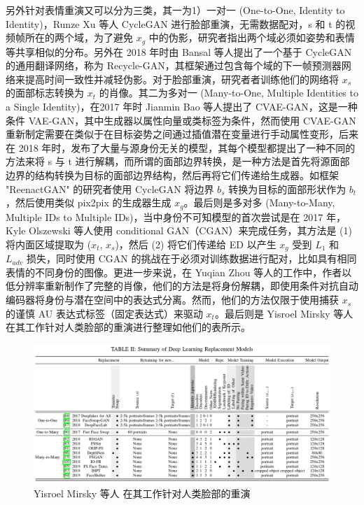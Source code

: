另外针对表情重演又可以分为三类，其一为1）一对一 (One-to-One, Identity to Identity)，Runze Xu 等人 CycleGAN 进行脸部重演，无需数据配对，s 和 t 的视频帧所在的两个域，为了避免 $x_g$ 中的伪影，研究者指出两个域必须如姿势和表情等共享相似的分布。另外在 2018 年时由 Bansal 等人提出了一个基于 CycleGAN 的通用翻译网络，称为 Recycle-GAN，其框架通过包含每个域的下一帧预测器网络来提高时间一致性并减轻伪影。对于脸部重演，研究者者训练他们的网络将 $x_s$ 的面部标志转换为 $x_t$ 的肖像。其二为多对一 (Many-to-One, Multiple Identities to a Single Identity)，在2017 年时 Jianmin Bao 等人提出了 CVAE-GAN，这是一种条件 VAE-GAN，其中生成器以属性向量或类标签为条件，然而使用 CVAE-GAN 重新制定需要在类似于在目标姿势之间通过插值潜在变量进行手动属性变形，后来在 2018 年时，发布了大量与源身份无关的模型，其每个模型都提出了一种不同的方法来将 s 与 t 进行解耦，而所谓的面部边界转换，是一种方法是首先将源面部边界的结构转换为目标的面部边界结构，然后再将它们传递给生成器。如框架 "ReenactGAN" 的研究者使用 CycleGAN 将边界 $b_s$ 转换为目标的面部形状作为 $b_t$ ，然后使用类似 pix2pix 的生成器生成 $x_g$。最后则是多对多 (Many-to-Many, Multiple IDs to Multiple IDs)，当中身份不可知模型的首次尝试是在 2017 年，Kyle Olszewski 等人使用 conditional GAN（CGAN）来完成任务，其方法是 (1) 将内面区域提取为 ($x_t$, $x_s$)，然后 (2) 将它们传递给 ED 以产生 $x_g$ 受到 $L_1$ 和 $L_{adv}$ 损失，同时使用 CGAN 的挑战在于必须对训练数据进行配对，比如具有相同表情的不同身份的图像。更进一步来说，在 Yuqian Zhou 等人的工作中，作者以低分辨率重新制作了完整的肖像，他们的方法是将身份解耦，即使用条件对抗自动编码器将身份与潜在空间中的表达式分离。然而，他们的方法仅限于使用捕获 $x_s$ 的谨慎 AU 表达式标签（固定表达式）来驱动 $x_t$。最后则是 Yisroel Mirsky 等人 \cite{DBLP:journals/corr/abs-2004-11138} 在其工作针对人类脸部的重演进行整理如他们的表所示。

\begin{figure}[htb]
\centering 
\includegraphics[width=1.10\textwidth]{img/ch4m10.png} 
\caption{ Yisroel Mirsky 等人 \cite{DBLP:journals/corr/abs-2004-11138} 在其工作针对人类脸部的重演}
\label{Test}
\end{figure}

